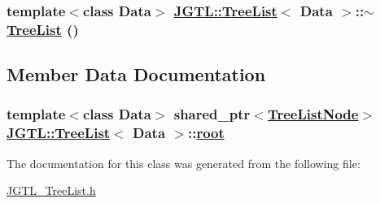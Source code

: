 \hypertarget{class_j_g_t_l_1_1_tree_list_dea76f406f9581d8a12866b15e7d4e4a}{
\subsubsection[$\sim$TreeList]{\setlength{\rightskip}{0pt plus 5cm}template$<$class Data$>$ \hyperlink{class_j_g_t_l_1_1_tree_list}{JGTL::Tree\-List}$<$ Data $>$::$\sim$\hyperlink{class_j_g_t_l_1_1_tree_list}{Tree\-List} ()}}
\label{class_j_g_t_l_1_1_tree_list_dea76f406f9581d8a12866b15e7d4e4a}




\subsection{Member Data Documentation}
\hypertarget{class_j_g_t_l_1_1_tree_list_dc1670851d8184e4f482627cbc7aaf6a}{
\subsubsection[root]{\setlength{\rightskip}{0pt plus 5cm}template$<$class Data$>$ shared\_\-ptr$<$\hyperlink{class_j_g_t_l_1_1_tree_list_node}{Tree\-List\-Node}$>$ \hyperlink{class_j_g_t_l_1_1_tree_list}{JGTL::Tree\-List}$<$ Data $>$::\hyperlink{class_j_g_t_l_1_1_tree_list_dc1670851d8184e4f482627cbc7aaf6a}{root}}}
\label{class_j_g_t_l_1_1_tree_list_dc1670851d8184e4f482627cbc7aaf6a}




The documentation for this class was generated from the following file:\begin{CompactItemize}
\item 
\hyperlink{_j_g_t_l___tree_list_8h}{JGTL\_\-Tree\-List.h}\end{CompactItemize}
